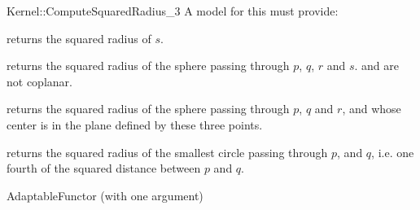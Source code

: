 \begin{ccRefFunctionObjectConcept}{Kernel::ComputeSquaredRadius_3}
A model for this must provide:


       {returns the squared radius of $s$. }

       {returns the squared radius of the sphere passing through $p$, $q$, $r$
       and $s$. \ccPrecond {} and  are not coplanar.}

       {returns the squared radius of the sphere passing through $p$, $q$ and
       $r$, and whose center is in the plane defined by these three points.}

{returns the squared radius of the smallest circle passing through $p$,
and $q$, i.e. one fourth of the squared distance between $p$ and $q$.}

\ccRefines
AdaptableFunctor (with one argument)

\ccSeeAlso
{}\\
 \\

\end{ccRefFunctionObjectConcept}
